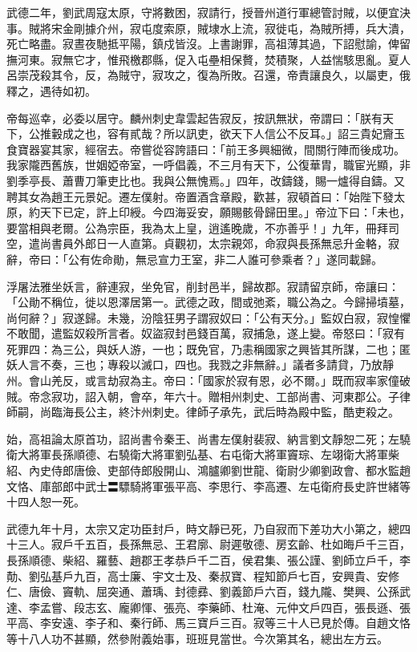 \begin{pinyinscope}
 武德二年，劉武周寇太原，守將數困，寂請行，授晉州道行軍總管討賊，以便宜決事。賊將宋金剛據介州，寂屯度索原，賊埭水上流，寂徙屯，為賊所搏，兵大潰，死亡略盡。寂晝夜馳抵平陽，鎮戍皆沒。上書謝罪，高祖薄其過，下詔慰諭，俾留撫河東。寂無它才，惟飛檄郡縣，促入屯壘相保贅，焚積聚，人益惴駭思亂。夏人呂崇茂殺其令，反，為賊守，寂攻之，復為所敗。召還，帝責讓良久，以屬吏，俄釋之，遇待如初。



 帝每巡幸，必委以居守。麟州刺史韋雲起告寂反，按訊無狀，帝謂曰：「朕有天下，公推轂成之也，容有貳哉？所以訊吏，欲天下人信公不反耳。」詔三貴妃齎玉食寶器宴其家，經宿去。帝嘗從容誇語曰：「前王多興細微，間關行陣而後成功。我家隴西舊族，世姻婭帝室，一呼倡義，不三月有天下，公復華胄，職宦光顯，非劉季亭長、蕭曹刀筆吏比也。我與公無愧焉。」四年，改鑄錢，賜一爐得自鑄。又聘其女為趙王元景妃。遷左僕射。帝置酒含章殿，歡甚，寂頓首曰：「始陛下發太原，約天下已定，許上印綬。今四海妥安，願賜骸骨歸田里。」帝泣下曰：「未也，要當相與老爾。公為宗臣，我為太上皇，逍遙晚歲，不亦善乎！」九年，冊拜司空，遣尚書員外郎日一人直第。貞觀初，太宗親郊，命寂與長孫無忌升金輅，寂辭，帝曰：「公有佐命勛，無忌宣力王室，非二人誰可參乘者？」遂同載歸。



 浮屠法雅坐妖言，辭連寂，坐免官，削封邑半，歸故郡。寂請留京師，帝讓曰：「公勛不稱位，徙以恩澤居第一。武德之政，間或弛紊，職公為之。今歸掃墳墓，尚何辭？」寂遂歸。未幾，汾陰狂男子謂寂奴曰：「公有天分。」監奴白寂，寂惶懼不敢聞，遣監奴殺所言者。奴盜寂封邑錢百萬，寂捕急，遂上變。帝怒曰：「寂有死罪四：為三公，與妖人游，一也；既免官，乃恚稱國家之興皆其所謀，二也；匿妖人言不奏，三也；專殺以滅口，四也。我戮之非無辭。」議者多請貸，乃放靜州。會山羌反，或言劫寂為主。帝曰：「國家於寂有恩，必不爾。」既而寂率家僮破賊。帝念寂功，詔入朝，會卒，年六十。贈相州刺史、工部尚書、河東郡公。子律師嗣，尚臨海長公主，終汴州刺史。律師子承先，武后時為殿中監，酷吏殺之。



 始，高祖論太原首功，詔尚書令秦王、尚書左僕射裴寂、納言劉文靜恕二死；左驍衛大將軍長孫順德、右驍衛大將軍劉弘基、右屯衛大將軍竇琮、左翊衛大將軍柴紹、內史侍郎唐儉、吏部侍郎殷開山、鴻臚卿劉世龍、衛尉少卿劉政會、都水監趙文恪、庫部郎中武士〓驃騎將軍張平高、李思行、李高遷、左屯衛府長史許世緒等十四人恕一死。



 武德九年十月，太宗又定功臣封戶，時文靜已死，乃自寂而下差功大小第之，總四十三人。寂戶千五百，長孫無忌、王君廓、尉遲敬德、房玄齡、杜如晦戶千三百，長孫順德、柴紹、羅藝、趙郡王孝恭戶千二百，侯君集、張公謹、劉師立戶千，李勣、劉弘基戶九百，高士廉、宇文士及、秦叔寶、程知節戶七百，安興貴、安修仁、唐儉、竇軌、屈突通、蕭瑀、封德彞、劉義節戶六百，錢九隴、樊興、公孫武達、李孟嘗、段志玄、龐卿惲、張亮、李藥師、杜淹、元仲文戶四百，張長遜、張平高、李安遠、李子和、秦行師、馬三寶戶三百。寂等三十人已見於傳。自趙文恪等十八人功不甚顯，然參附義始事，班班見當世。今次第其名，總出左方云。




\end{pinyinscope}
